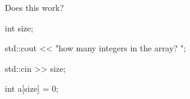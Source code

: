 Does this work?



\begin{consolethree}[escapeinside=||]int size;

std::cout << "how many integers in the array? ";

std::cin >> size;



int a[size] = {0}; 

\end{consolethree}

